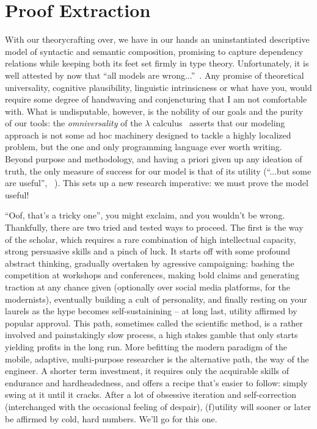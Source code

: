 \chapter{Proof Extraction}
\label{chapter:chapter_3}


With our theorycrafting over, we have in our hands an uninstantiated descriptive model of syntactic and semantic composition, promising to capture dependency relations while keeping both its feet set firmly in type theory.
Unfortunately, it is well attested by now that ``all models are wrong...''~\cite{doi:10.1080/01621459.1976.10480949}.
Any promise of theoretical universality, cognitive plausibility, linguistic intrinsicness or what have you, would require some degree of handwaving and conjencturing that I am not comfortable with.
What is undisputable, however, is the nobility of our goals and the purity of our tools: the \textit{omniversality} of the $\lambda$ calculus~\cite{wadler2015propositions} asserts that our modeling approach is not some ad hoc machinery designed to tackle a highly localized problem, but the one and only programming language ever worth writing. 
Beyond purpose and methodology, and having a priori given up any ideation of truth, the only measure of success for our model is that of its utility (``...but some are useful'', ~\cite{doi:10.1080/01621459.1976.10480949}).
This sets up a new research imperative: we must prove the model useful!

``Oof, that's a tricky one'', you might exclaim, and you wouldn't be wrong.
Thankfully, there are two tried and tested ways to proceed.
The first is the way of the scholar, which requires a rare combination of high intellectual capacity, strong persuasive skills and a pinch of luck.
It starts off with some profound abstract thinking, gradually overtaken by agressive campaigning: bashing the competition at workshops and conferences, making bold claims and generating traction at any chance given (optionally over social media platforms, for the modernists), eventually building a cult of personality, and finally resting on your laurels as the hype becomes self-sustainining -- at long last, utility affirmed by popular approval.
This path, sometimes called the scientific method, is a rather involved and painstakingly slow process, a high stakes gamble that only starts yielding profits in the long run.
More befitting the modern paradigm of the mobile, adaptive, multi-purpose researcher is the alternative path, the way of the engineer.
A shorter term investment, it requires only the acquirable skills of endurance and hardheadedness, and offers a recipe that's easier to follow: simply swing at it until it cracks.
After a lot of obsessive iteration and self-correction (interchanged with the occasional feeling of despair), (f)utility will sooner or later be affirmed by cold, hard numbers.
We'll go for this one.

